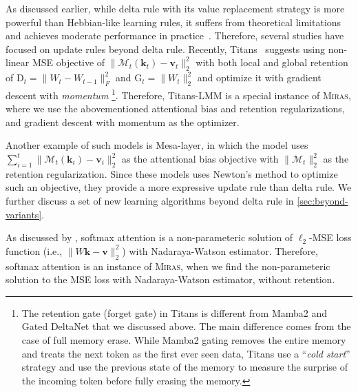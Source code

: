 \documentclass{article}
\newcommand{\citep}{\parencite}
\newcommand{\citet}{\textcite}
\newcommand{\framework}[0]{\textsc{Miras}}
\newcommand{\vk}[0]{\mathbf{k}}
\newcommand{\vvv}[0]{\mathbf{v}}
\newcommand{\M}[0]{\mathcal{M}}
\theoremstyle{plain}
\theoremstyle{definition}
\theoremstyle{remark}
\newcommand{\head}[1]{\vspace{1.7mm}\noindent{{\textcolor{c2}{\bf #1.}}}}
\begin{document}
\head{Beyond Delta Rule}
As discussed earlier, while delta rule with its value replacement strategy is more powerful than Hebbian-like learning rules, it suffers from theoretical limitations~\citep{irie2023practical} and achieves moderate performance in practice~\citep{yang2024parallelizing}. Therefore, several studies have focused on update rules beyond delta rule. Recently, Titans~\citep{behrouz2024titans} suggests using non-linear MSE objective of $\|\M_t(\vk_t) - \vvv_t\|^2_2$ with both local and global retention of $\mbox{D}_t = \|W_t - W_{t-1} \|_F^2$ and $\mbox{G}_t = \|W_t \|^2_2$ and optimize it with gradient descent with \emph{momentum} \footnote{The retention gate (forget gate) in Titans is different from Mamba2 and Gated DeltaNet that we discussed above. The main difference comes from the case of full memory erase. While Mamba2 gating removes the entire memory and treats the next token as the first ever seen data, Titans use a ``\emph{cold start}'' strategy and use the previous state of the memory to measure the surprise of the incoming token before fully erasing the memory.}. Therefore, Titans-LMM is a special instance of \framework, where we use the abovementioned attentional bias and retention regularizations, and gradient descent with momentum as the optimizer. 

Another example of such models is Mesa-layer, in which the model uses $\sum_{i = 1}^{t} \|\M_t(\vk_i) - \vvv_i\|^2_2$ as the attentional bias objective with $\|\M_t\|_2^{2}$ as the retention regularization. Since these models uses Newton's method to optimize such an objective, they provide a more expressive update rule than delta rule. We further discuss a set of new learning algorithms beyond delta rule in \autoref{sec:beyond-variants}. 

\head{Attention}
As discussed by \citet{sun2024learning}, softmax attention is a non-parameteric solution of $\ell_2$-MSE loss function (i.e., $\|W \vk - \vvv\|_2^2$) with Nadaraya-Watson estimator. Therefore, softmax attention is an instance of \framework, when we find the non-parameteric solution to the MSE loss with Nadaraya-Watson estimator, without retention. 
\end{document}
